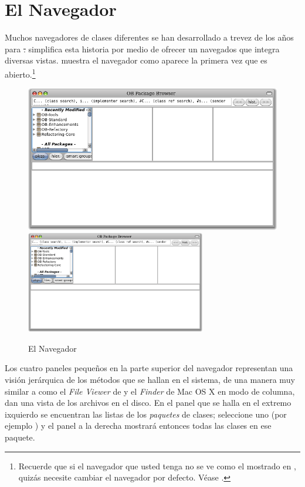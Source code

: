 \documentclass[a4paper,10pt,twoside]{book}
\begin{document}
\section{El Navegador}

Muchos navegadores de clases diferentes se han desarrollado a trevez de los años para \st.
\pharo simplifica esta historia por medio de ofrecer un navegados que integra diversas vistas.
 muestra el navegador como aparece la primera vez que es abierto.\footnote{Recuerde que si el navegador que usted tenga no se ve como el mostrado en , quiz\'as necesite cambiar el navegador por defecto.  V\'ease .}

\begin{figure}[htbp]
   \centering
   \ifluluelse
	 {\includegraphics[width=\textwidth]{SystemBrowser0} }
	 {\includegraphics[width=0.7\textwidth]{SystemBrowser0} }
   \caption{El Navegador}
\end{figure}

Los cuatro paneles pequeños en la parte superior del navegador representan una visi\'on jer\'arquica de los m\'etodos que se hallan en el sistema, de una manera muy similar a como el \textit{File Viewer} de  y el \textit{Finder} de Mac OS X en modo de columna, dan una vista de los archivos en el disco.
En el panel que se halla en el extremo ixquierdo se encuentran las listas de los \emph{paquetes} de clases; seleccione uno (por ejemplo ) y el panel a la derecha mostrar\'a entonces todas las clases en ese paquete.
\end{document}
